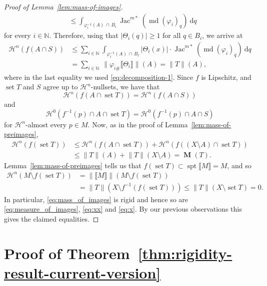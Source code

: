 \documentclass[reqno]{amsart}
\numberwithin{equation}{section}
\newcommand{\N}{\mathbb{N}}
\newcommand{\spt}{\operatorname{spt}}
\newcommand{\Jac}{\operatorname{Jac}}
\newcommand{\md}{\operatorname{md}}
\newcommand{\norm}[1]{\lVert#1\rVert}
\newcommand{\abs}[1]{\lvert#1\rvert}
\newcommand{\bb}[1]{\llbracket #1\rrbracket}
\DeclareMathOperator{\mass}{\mathbf{M}}
\DeclareMathOperator{\set}{set}
\begin{document}
\begin{proof}[Proof of Lemma~\ref{lem:mass-of-images}]
\begin{align}
    &\leq  \int_{\varphi^{-1}_i(A)\,\cap \,B_i}  \Jac^{m*}(\md (\varphi_i)_q) \ \textrm{d}q 
\end{align} 
for every \(i \in \N\). Therefore, using that \( \abs{\Theta_i(q)} \geq 1\) for all \(q\in B_i\), we arrive at
\begin{align} \label{eq:measure_of_images}
    \mathcal{H}^n(f(A\cap S))&\leq \sum_{i\in \mathbb{N}} \int_{\varphi^{-1}_i(A)\,\cap \,B_i}  |\Theta_i(x)|\cdot \Jac^{m*}(\md (\varphi_i)_q)\ \textrm{d}q \nonumber\\
        &=\sum_{i\in \mathbb{N}} \,\norm{\varphi_{i\#}\bb{\Theta_i}}(A) 
    =\norm{T}(A),
\end{align}
where in the last equality we used \eqref{eq:decomposition-1}. 
Since $f$ is Lipschitz, and \(\set T\) and $S$ agree up to $\mathcal{H}^n$-nullsets, we have that
\[
\mathcal{H}^n(f(A\cap \set T))=\mathcal{H}^n(f(A\cap S))
\]
and 
\[
\mathcal{H}^0\left( f^{-1}(p)\cap A \cap \set T \right)=\mathcal{H}^0\left( f^{-1}(p)\cap A \cap S\right)
\]
for $\mathcal{H}^n$-almost every $p\in M$. Now, as in the proof of Lemma~\ref{lem:mass-of-preimages},
\begin{align}\label{eq:mass_of_images}
\mathcal{H}^n(f(\set T))&\leq \mathcal{H}^n(f(A\cap \set T))+\mathcal{H}^n(f((X\setminus A)\cap \set T)) \nonumber\\
&\leq \norm{T}(A)+\norm{T}(X\setminus A)=\mass(T).
\end{align}
Lemma~\ref{lem:mass-of-preimages} tells us that $f(\set T)\subset \spt \bb{M}=M$, and so 
\begin{align*}
\mathcal{H}^n(M\setminus f(\set T))&=\norm{\bb{M}}(M\setminus f(\set T))\\
 &=\norm{T}(X\setminus f^{-1}(f(\set T)))\leq \norm{T}(X\setminus \set T)=0.
\end{align*}
In particular, \eqref{eq:mass_of_images} is rigid and hence so are \eqref{eq:measure_of_images},  \eqref{eq:xx} and \eqref{eq:x}. By our previous observations this gives the claimed equalities.
\end{proof}


\section{Proof of Theorem~\ref{thm:rigidity-result-current-version}}\label{sec:4}
\end{document}
